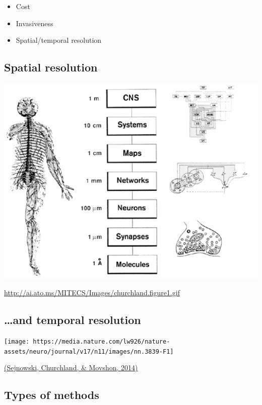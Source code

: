 \documentclass[]{article}
\providecommand{\tightlist}{%
  \setlength{\itemsep}{0pt}\setlength{\parskip}{0pt}}
\begin{document}
\begin{itemize}
\tightlist
\item
  Cost
\item
  Invasiveness
\item
  Spatial/temporal resolution
\end{itemize}

\hypertarget{spatial-resolution}{%
\subsection{Spatial resolution}\label{spatial-resolution}}

\begin{center}\includegraphics[width=600]{img/churchland-levels-of-analysis} \end{center}

\url{http://ai.ato.ms/MITECS/Images/churchland.figure1.gif}

\hypertarget{and-temporal-resolution}{%
\subsection{\ldots{}and temporal
resolution}\label{and-temporal-resolution}}

\begin{center}\texttt{[image: https://media.nature.com/lw926/nature-assets/neuro/journal/v17/n11/images/nn.3839-F1]} \end{center}

\href{http://doi.org/10.1038/nn.3839}{(Sejnowski, Churchland, \&
Movshon, 2014)}

\hypertarget{types-of-methods}{%
\subsection{Types of methods}\label{types-of-methods}}
\end{document}
